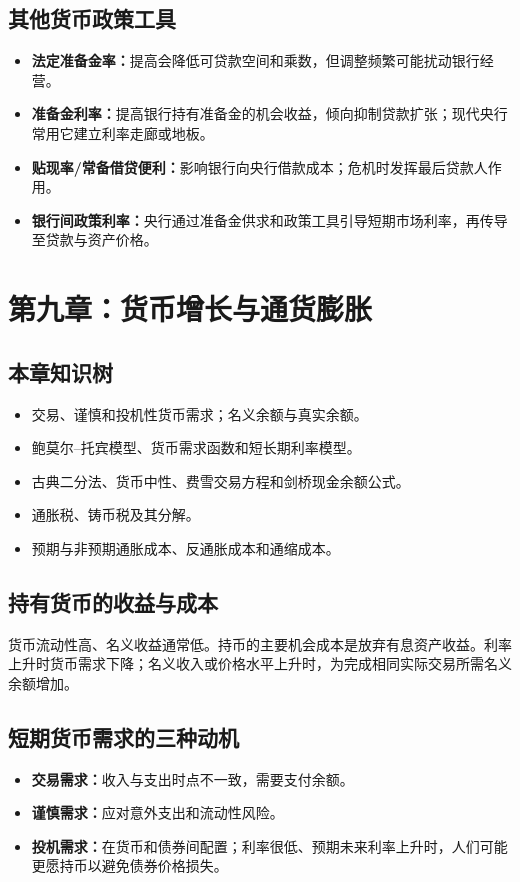 \documentclass[UTF8,11pt,a4paper]{ctexart}
\newcommand{\term}[1]{\textbf{#1}}
\begin{document}
\subsection{其他货币政策工具}
\begin{itemize}
  \item \term{法定准备金率：}提高会降低可贷款空间和乘数，但调整频繁可能扰动银行经营。
  \item \term{准备金利率：}提高银行持有准备金的机会收益，倾向抑制贷款扩张；现代央行常用它建立利率走廊或地板。
  \item \term{贴现率/常备借贷便利：}影响银行向央行借款成本；危机时发挥最后贷款人作用。
  \item \term{银行间政策利率：}央行通过准备金供求和政策工具引导短期市场利率，再传导至贷款与资产价格。
\end{itemize}

\newpage
\section{第九章：货币增长与通货膨胀}

\subsection{本章知识树}
\begin{itemize}
  \item 交易、谨慎和投机性货币需求；名义余额与真实余额。
  \item 鲍莫尔--托宾模型、货币需求函数和短长期利率模型。
  \item 古典二分法、货币中性、费雪交易方程和剑桥现金余额公式。
  \item 通胀税、铸币税及其分解。
  \item 预期与非预期通胀成本、反通胀成本和通缩成本。
\end{itemize}

\subsection{持有货币的收益与成本}
货币流动性高、名义收益通常低。持币的主要机会成本是放弃有息资产收益。利率上升时货币需求下降；名义收入或价格水平上升时，为完成相同实际交易所需名义余额增加。

\subsection{短期货币需求的三种动机}
\begin{itemize}
  \item \term{交易需求：}收入与支出时点不一致，需要支付余额。
  \item \term{谨慎需求：}应对意外支出和流动性风险。
  \item \term{投机需求：}在货币和债券间配置；利率很低、预期未来利率上升时，人们可能更愿持币以避免债券价格损失。
\end{itemize}
\end{document}
